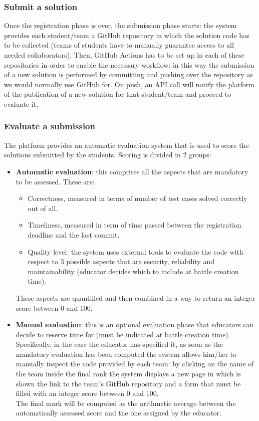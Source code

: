 \subsubsection{Submit a solution}
Once the registration phase is over, the submission phase starts: the system provides each student/team a GitHub repository in which the solution code has to be collected (teams of students have to manually guarantee access to all needed collaborators). Then, GitHub Actions has to be set up in each of these repositories in order to enable the necessary workflow: in this way the submission of a new solution is performed by committing and pushing over the repository as we would normally use GitHub for. On push, an API call will notify the platform of the publication of a new solution for that student/team and proceed to evaluate it.
\subsubsection{Evaluate a submission}
The platform provides an automatic evaluation system that is used to score the solutions submitted by the students. Scoring is divided in 2 groups:
\begin{itemize}
    \item \textbf{Automatic evaluation}: this comprises all the aspects that are mandatory to be assessed. These are:
    \begin{itemize}
        \item Correctness, measured in terms of number of test cases solved correctly out of all.
        \item Timeliness, measured in term of time passed between the registration deadline and the last commit.
        \item Quality level: the system uses external tools to evaluate the code with respect to 3 possible aspects that are security, reliability and maintainability (educator decides which to include at battle creation time).
    \end{itemize}
    These aspects are quantified and then combined in a way to return an integer score between 0 and 100.
    \item \textbf{Manual evaluation}: this is an optional evaluation phase that educators can decide to reserve time for (must be indicated at battle creation time). Specifically, in the case the educator has specified it, as soon as the mandatory evaluation has been computed the system allows him/her to manually inspect the code provided by each team: by clicking on the name of the team inside the final rank the system displays a new page in which is shown the link to the team’s GitHub repository and a form that must be filled with an integer score between 0 and 100.\\ The final mark will be computed as the arithmetic average between the automatically assessed score and the one assigned by the educator.
\end{itemize}
